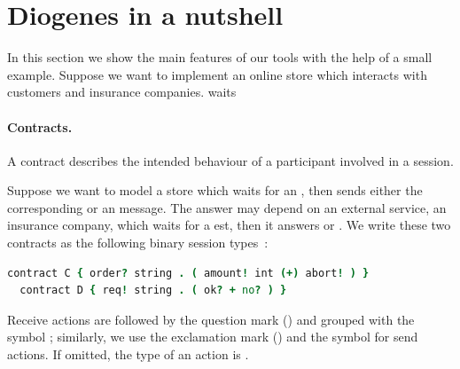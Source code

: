 \section{Diogenes in a nutshell}

In this section we show the main features of our tools
with the help of a small example.
Suppose we want to implement an online store which 
interacts with customers and insurance companies.
waits
% 




\paragraph{Contracts.}
A contract describes the intended behaviour of a
participant involved in a session.

Suppose we want to model a store which waits for an ,
then sends either the corresponding  or an  message.
The answer may depend on an external service, \eg an insurance company,
which waits for a est, then it answers  or .
% 
We write these two contracts as the following 
binary session types~\cite{Honda98esop}:
% 
\begin{lstlisting}[language=coco,basicstyle=\scriptsize\ttfamily]
  contract C { order? string . ( amount! int (+) abort! ) }
  contract D { req! string . ( ok? + no? ) }
\end{lstlisting}
Receive actions are followed by the question mark () and grouped
with the symbol \code{+}; similarly, we use the
exclamation mark (\code{!}) and the symbol \code{(+)} for
send actions. If omitted, the type of an action is .


